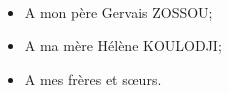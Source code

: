 \dedicace
\paragraph{}


\begin{itemize}
	\item[\ding{42}] A mon père Gervais ZOSSOU;
	\item[\ding{42}] A ma mère Hélène KOULODJI;
	\item[\ding{42}] A mes frères et sœurs.
\end{itemize}